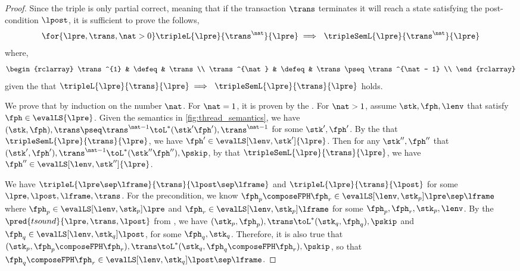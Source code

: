 \begin{proof}

Since the triple is only partial correct, meaning that if the transaction \( \trans \) terminates it will reach a state satisfying the post-condition \( \lpost \), it is sufficient to prove the follows,
\[
    \for{\lpre, \trans, \nat > 0} \tripleL{\lpre}{\trans^{\nat}}{\lpre} \implies \ \tripleSemL{\lpre}{\trans^{\nat}}{\lpre} \\
\]
where,
\[
\begin{rclarray}
    \trans^{1} & \defeq  & \trans \\
    \trans^{\nat} & \defeq  & \trans \pseq \trans^{\nat - 1} \\
\end{rclarray}
\]
given the \ih that \(\tripleL{\lpre}{\trans}{\lpre} \implies \ \tripleSemL{\lpre}{\trans}{\lpre} \) holds.

We prove that by induction on the number \( \nat \).
For \( \nat = 1 \), it is proven by the \ih.
For \( \nat > 1 \), assume \( \stk, \fph, \lenv \) that satisfy \( \fph \in \evalLS{\lpre} \). 
Given the semantics in \fig \ref{fig:thread_semantics}, we have \( (\stk, \fph), \trans \pseq \trans^{\nat - 1} \toL^{*} (\stk' \fph'), \trans^{\nat - 1} \) for some \( \stk', \fph' \).
By the \ih that \(\tripleSemL{\lpre}{\trans}{\lpre} \), we have \( \fph' \in \evalLS[\lenv, \stk']{\lpre} \).
Then for any \( \stk'', \fph'' \) that \( (\stk', \fph'), \trans^{\nat - 1} \toL^{*} (\stk'' \fph''), \pskip \), by \ih that \( \tripleSemL{\lpre}{\trans}{\lpre} \), we have \( \fph'' \in \evalLS[\lenv, \stk'']{\lpre} \).

We have \( \tripleL{\lpre \sep \lframe }{\trans}{\lpost \sep \lframe} \) and \( \tripleL{\lpre}{\trans}{\lpost} \) for some \( \lpre, \lpost, \lframe, \trans\).
For the precondition, we know \( \fph_{p} \composeFPH \fph_{r} \in \evalLS[\lenv, \stk_{p}]{\lpre \sep \lframe} \) where \(  \fph_{p} \in \evalLS[\lenv, \stk_{p}]{\lpre} \) and \( \fph_{r} \in \evalLS[\lenv, \stk_{p}]{\lframe} \) for some \( \fph_{p}, \fph_{r}, \stk_{p}, \lenv \).
By the \( \pred{tsound}{\lpre, \trans, \lpost } \) from \ih, we have \( ( \stk_{p}, \fph_{p} ), \trans \toL^{*} (\stk_{q}, \fph_{q}), \pskip \) and \( \fph_{q} \in \evalLS[\lenv, \stk_{q}]{\lpost}\), for some \( \fph_{q}, \stk_{q} \).
Therefore, it is also true that \( ( \stk_{p}, \fph_{p} \composeFPH \fph_{r} ), \trans \toL^{*} (\stk_{q}, \fph_{q} \composeFPH \fph_{r}), \pskip \), so that \( \fph_{q} \composeFPH \fph_{r} \in \evalLS[\lenv, \stk_{q}]{\lpost \sep \lframe} \).

\end{proof}

